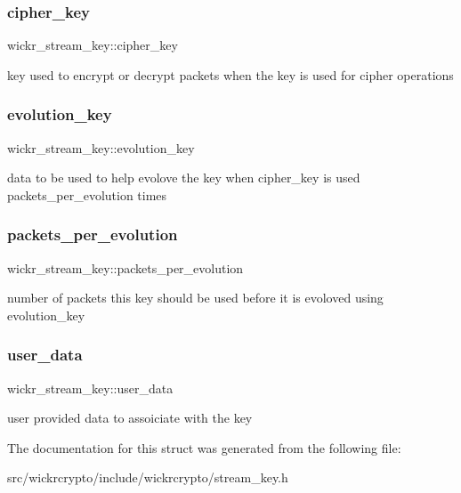 \subsubsection{\texorpdfstring{cipher\_key}{cipher\_key}}
{\footnotesize\ttfamily wickr\+\_\+stream\+\_\+key\+::cipher\+\_\+key}

key used to encrypt or decrypt packets when the key is used for cipher operations \mbox{\label{structwickr__stream__key_ae7210bd67e61cb4c38733a237dae95d9}} 
\subsubsection{\texorpdfstring{evolution\_key}{evolution\_key}}
{\footnotesize\ttfamily wickr\+\_\+stream\+\_\+key\+::evolution\+\_\+key}

data to be used to help evolove the key when \textquotesingle{}cipher\+\_\+key\textquotesingle{} is used \textquotesingle{}packets\+\_\+per\+\_\+evolution\textquotesingle{} times \mbox{\label{structwickr__stream__key_a78777e4c64048b6dae38f8772744194e}} 
\subsubsection{\texorpdfstring{packets\_per\_evolution}{packets\_per\_evolution}}
{\footnotesize\ttfamily wickr\+\_\+stream\+\_\+key\+::packets\+\_\+per\+\_\+evolution}

number of packets this key should be used before it is evoloved using \textquotesingle{}evolution\+\_\+key\textquotesingle{} \mbox{\label{structwickr__stream__key_a51e59da9f7fbb0b3e1332a20252d1cc6}} 
\subsubsection{\texorpdfstring{user\_data}{user\_data}}
{\footnotesize\ttfamily wickr\+\_\+stream\+\_\+key\+::user\+\_\+data}

user provided data to assoiciate with the key 

The documentation for this struct was generated from the following file\+:\begin{DoxyCompactItemize}
\item 
src/wickrcrypto/include/wickrcrypto/stream\+\_\+key.\+h\end{DoxyCompactItemize}
